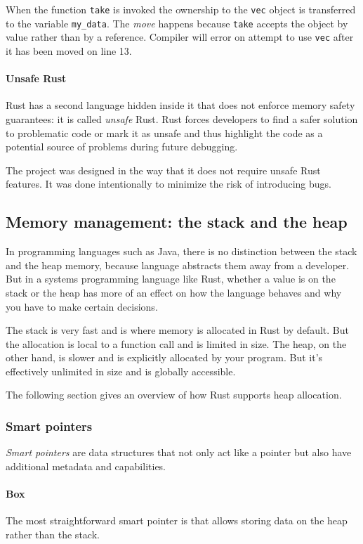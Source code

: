When the function \texttt{take} is invoked the ownership to the \texttt{vec} object is transferred to the variable \texttt{my_data}. The \emph{move} happens because \texttt{take} accepts the object by value rather than by a reference. Compiler will error on attempt to use \texttt{vec} after it has been moved on line 13.

\paragraph{Unsafe Rust}
Rust has a second language hidden inside it that does not enforce memory safety guarantees: it is called \emph{unsafe} Rust. Rust forces developers to find a safer solution to problematic code or mark it as unsafe and thus highlight the code as a potential source of problems during future debugging.

The \pvecrs{} project was designed in the way that it does not require unsafe Rust features. It was done intentionally to minimize the risk of introducing bugs.

\subsection{Memory management: the stack and the heap}
In programming languages such as Java, there is no distinction between the stack and the heap memory, because language abstracts them away from a developer. But in a systems programming language like Rust, whether a value is on the stack or the heap has more of an effect on how the language behaves and why you have to make certain decisions.

The stack is very fast and is where memory is allocated in Rust by default. But the allocation is local to a function call and is limited in size. The heap, on the other hand, is slower and is explicitly allocated by your program. But it’s effectively unlimited in size and is globally accessible.

The following section gives an overview of how Rust supports heap allocation.

\subsubsection*{Smart pointers}
\emph{Smart pointers} are data structures that not only act like a pointer but also have additional metadata and capabilities.

\paragraph{Box}
The most straightforward smart pointer is  that allows storing data on the heap rather than the stack.

